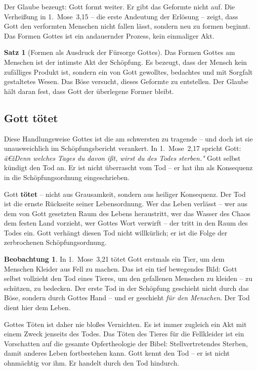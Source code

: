 ﻿\documentclass[a4paper,12pt]{article}
\theoremstyle{definition}
\newtheorem{theorem}{Satz}[section]
\newtheorem{observation}{Beobachtung}[section]
\begin{document}
Der Glaube bezeugt: Gott formt weiter. Er gibt das Geformte nicht auf. Die
Verheißung in 1.~Mose~3,15 -- die erste Andeutung der Erlösung -- zeigt, dass
Gott den verformten Menschen nicht fallen lässt, sondern neu zu formen beginnt.
Das Formen Gottes ist ein andauernder Prozess, kein einmaliger Akt.

\begin{theorem}[Formen als Ausdruck der Fürsorge Gottes]
	Das Formen Gottes am Menschen ist der intimste Akt der Schöpfung. Es bezeugt,
	dass der Mensch kein zufälliges Produkt ist, sondern ein von Gott gewolltes,
	bedachtes und mit Sorgfalt gestaltetes Wesen. Das Böse versucht, dieses Geformte
	zu entstellen. Der Glaube hält daran fest, dass Gott der überlegene Former bleibt.
\end{theorem}

\subsection{Gott tötet}

Diese Handlungsweise Gottes ist die am schwersten zu tragende -- und doch ist
sie unausweichlich im Schöpfungsbericht verankert. In 1.~Mose~2,17 spricht Gott:
\textit{â€žDenn welches Tages du davon ißt, wirst du des Todes sterben."} Gott
selbst kündigt den Tod an. Er ist nicht überrascht vom Tod -- er hat ihn als
Konsequenz in die Schöpfungsordnung eingeschrieben.

Gott \textbf{tötet} -- nicht aus Grausamkeit, sondern aus heiliger Konsequenz.
Der Tod ist die ernste Rückseite seiner Lebensordnung. Wer das Leben verlässt --
wer aus dem von Gott gesetzten Raum des Lebens heraustritt, wer das Wasser des
Chaos dem festen Land vorzieht, wer Gottes Wort verwirft -- der tritt in den Raum
des Todes ein. Gott verhängt diesen Tod nicht willkürlich; er ist die Folge der
zerbrochenen Schöpfungsordnung.

\begin{observation}
	In 1.~Mose~3,21 tötet Gott erstmals ein Tier, um dem Menschen Kleider aus
	Fell zu machen. Das ist ein tief bewegendes Bild: Gott selbst vollzieht den
	Tod eines Tieres, um den gefallenen Menschen zu kleiden -- zu schützen, zu
	bedecken. Der erste Tod in der Schöpfung geschieht nicht durch das Böse, sondern
	durch Gottes Hand -- und er geschieht \textit{für den Menschen}. Der Tod dient
	hier dem Leben.
\end{observation}

Gottes Töten ist daher nie bloßes Vernichten. Es ist immer zugleich ein Akt mit
einem Zweck jenseits des Todes. Das Töten des Tieres für die Fellkleider ist ein
Vorschatten auf die gesamte Opfertheologie der Bibel: Stellvertretendes Sterben,
damit anderes Leben fortbestehen kann. Gott kennt den Tod -- er ist nicht
ohnmächtig vor ihm. Er handelt durch den Tod hindurch.
\end{document}
